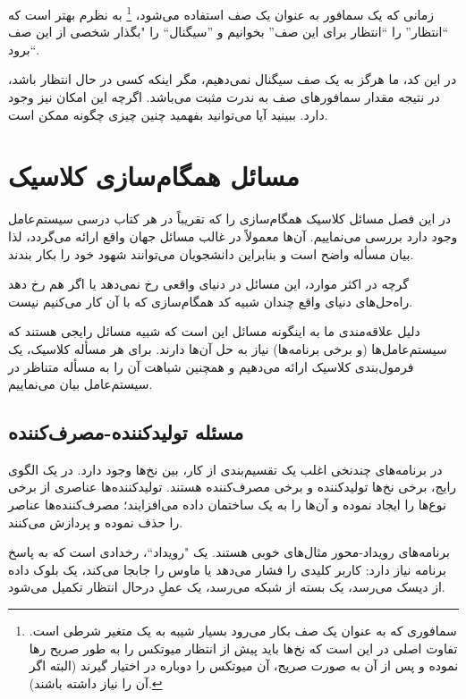 \documentclass{book}
\newcommand{\clearemptydoublepage}{}%
\begin{document}
    زمانی که یک سمافور به عنوان یک صف استفاده می‌شود،%
\footnote{
    سمافوری که به عنوان یک صف بکار می‌رود بسیار شیبه به یک متغیر شرطی است. تفاوت اصلی در این است که نخ‌ها باید پیش از انتظار میوتکس را به طور صریح
     رها نموده و پس از آن به صورت صریح، آن میوتکس را دوباره در اختیار گیرند (البته اگر آن را نیاز داشته باشند). }
    به نظرم بهتر است که ``انتظار'' را ``انتظار برای این صف'' بخوانیم و ''سیگنال`` را  "بگذار شخصی از این صف برود``.
    
    در این کد، ما هرگز به یک صف سیگنال نمی‌دهیم، مگر اینکه کسی در حال انتظار باشد، 
    در نتیجه مقدار سمافور‌های صف به ندرت مثبت می‌باشد. اگرچه این امکان نیز وجود دارد. 
    ببینید آیا می‌توانید بفهمید چنین چیزی چگونه ممکن است.


\clearemptydoublepage
\chapter{مسائل همگام‌سازی کلاسیک}

    در این فصل مسائل کلاسیک همگام‌سازی را که تقریباً در هر کتاب درسی سیستم‌عامل وجود دارد بررسی می‌نماییم. 
    آن‌ها معمولاً در غالب مسائل جهان واقع ارائه می‌گردد، لذا بیان مسأله واضح است و بنابراین دانشجویان می‌توانند شهود خود را بکار بندند. 
    
    گرچه در اکثر موارد، این مسائل در دنیای واقعی رخ نمی‌دهد یا اگر هم رخ دهد راه‌حل‌های دنیای واقع چندان شبیه کد همگام‌سازی 
    که با آن کار می‌کنیم نیست. 

    دلیل علاقه‌مندی ما به اینگونه مسائل این است که شبیه مسائل رایجی هستند که سیستم‌عامل‌ها  (و برخی برنامه‌ها) نیاز به حل آن‌ها دارند. 
    برای هر مسأله کلاسیک، یک فرمول‌بندی کلاسیک ارائه می‌دهیم و همچنین شباهت آن را به مسأله متناظر در سیستم‌عامل  بیان می‌نماییم. 

\section{مسئله تولیدکننده-مصرف‌کننده}

    در برنامه‌های چندنخی اغلب یک تقسیم‌بندی از کار، بین نخ‌ها وجود دارد. در یک الگوی رایج، برخی نخ‌ها تولیدکننده و برخی مصرف‌کننده هستند. 
    تولیدکننده‌ها عناصری از برخی نوع‌ها را ایجاد نموده و آن‌ها را به یک ساختمان داده می‌افزایند؛ مصرف‌کننده‌ها عناصر را حذف نموده و پردازش می‌کنند.

    برنامه‌های رویداد-محور مثال‌های خوبی هستند. یک "رویداد``، رخدادی است که به پاسخ برنامه نیاز دارد: 
    کاربر کلیدی را فشار می‌دهد یا ماوس را جابجا می‌کند، یک بلوک داده از دیسک می‌رسد، یک بسته از شبکه می‌رسد، یک عملِ در‌حال انتظار تکمیل می‌شود.
\end{document}
